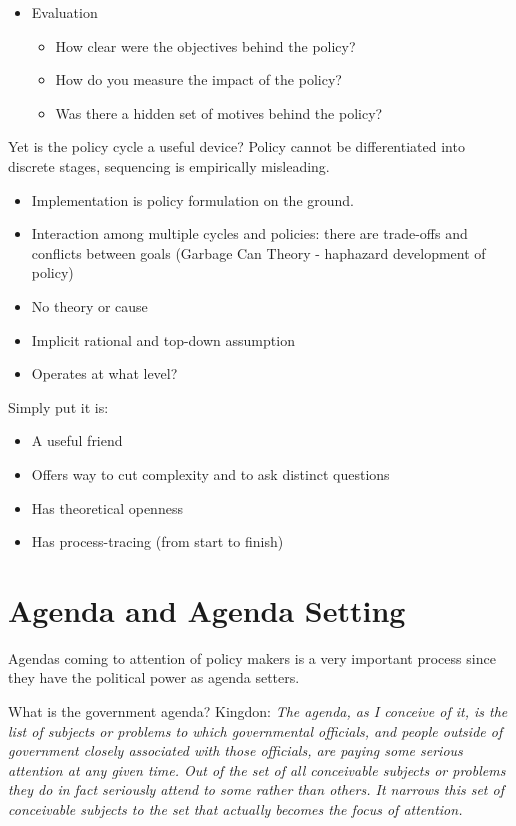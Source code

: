 \documentclass[12pt, letterpaper]{article}
\begin{document}
{\begin{itemize}
\begin{itemize}
			\item Were there unforeseen hitches and obstacles?
			\item Were street-level bureaucrats selective in how they implemented instructions? (Policy and cattling)
		\end{itemize}
	\item Evaluation
		\begin{itemize}
			\item How clear were the objectives behind the policy?
			\item How do you measure the impact of the policy?
			\item Was there a hidden set of motives behind the policy?
		\end{itemize}
\end{itemize}
Yet is the policy cycle a useful device? Policy cannot be differentiated into discrete stages, sequencing is empirically misleading.
\begin{itemize}
	\item Implementation is policy formulation on the ground.
	\item Interaction among multiple cycles and policies: there are trade-offs and conflicts between goals (Garbage Can Theory - haphazard development of policy)
	\item No theory or cause
	\item Implicit rational and top-down assumption
	\item Operates at what level?
\end{itemize}
Simply put it is:
\begin{itemize}
	\item A useful friend
	\item Offers way to cut complexity and to ask distinct questions
	\item Has theoretical openness
	\item Has process-tracing (from start to finish)
\end{itemize}


\section{Agenda and Agenda Setting}
Agendas coming to attention of policy makers is a very important process since they have the political power as agenda setters.

What is the government agenda?
Kingdon: \textit{The agenda, as I conceive of it, is the list of subjects or problems to which governmental officials, and people outside of government closely associated with those officials, are paying some serious attention at any given time. Out of the set of all conceivable subjects or problems they do in fact seriously attend to some rather than others. It narrows this set of conceivable subjects to the set that actually becomes the focus of attention.}

}
\end{document}
